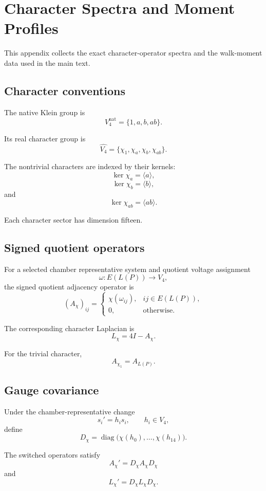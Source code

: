 \section{Character Spectra and Moment Profiles}

This appendix collects the exact character-operator spectra and the
walk-moment data used in the main text.

\subsection{Character conventions}

The native Klein group is
\[
V_4^{\mathrm{nat}}
=
\{1,a,b,ab\}.
\]

Its real character group is
\[
\widehat{V_4}
=
\{\chi_1,\chi_a,\chi_b,\chi_{ab}\}.
\]

The nontrivial characters are indexed by their kernels:
\[
\ker\chi_a=\langle a\rangle,
\]
\[
\ker\chi_b=\langle b\rangle,
\]
and
\[
\ker\chi_{ab}=\langle ab\rangle.
\]

Each character sector has dimension fifteen.

\subsection{Signed quotient operators}

For a selected chamber representative system and quotient voltage
assignment
\[
\omega:E(L(P))\longrightarrow V_4,
\]
the signed quotient adjacency operator is
\[
(A_\chi)_{ij}
=
\begin{cases}
\chi(\omega_{ij}), & ij\in E(L(P)),\\
0, & \text{otherwise}.
\end{cases}
\]

The corresponding character Laplacian is
\[
L_\chi=4I-A_\chi.
\]

For the trivial character,
\[
A_{\chi_1}=A_{L(P)}.
\]

\subsection{Gauge covariance}

Under the chamber-representative change
\[
s_i'=h_is_i,
\qquad
h_i\in V_4,
\]
define
\[
D_\chi
=
\operatorname{diag}
\bigl(
\chi(h_0),\ldots,\chi(h_{14})
\bigr).
\]

The switched operators satisfy
\[
A_\chi'
=
D_\chi A_\chi D_\chi
\]
and
\[
L_\chi'
=
D_\chi L_\chi D_\chi.
\]

